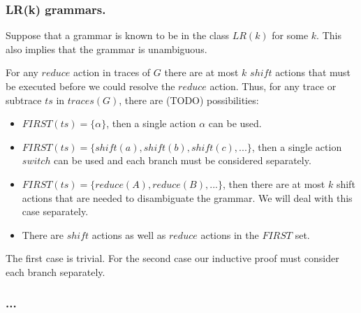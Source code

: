 \documentclass[envcountsame,runningheads]{llncs}
\begin{document}
\subsubsection{LR(k) grammars.}

Suppose that a grammar is known to be in the class $LR(k)$ for some $k$. This also implies that the grammar is unambiguous.

For any $reduce$ action in traces of $G$ there are at most $k$ $shi\!ft$ actions that must be executed before we could resolve the $reduce$ action.
Thus, for any trace or subtrace $ts$ in $traces(G)$, there are (TODO) possibilities:

\begin{itemize}
  \item $F\!I\!RST(ts) = \{ \alpha \}$, then a single action $\alpha$ can be used.
  \item $F\!I\!RST(ts) = \{ shift(a), shift(b), shift(c), ... \}$, then a single action $switch$ can be used and each branch must be considered separately.
  \item $F\!I\!RST(ts) = \{ reduce(A), reduce(B), ... \}$, then there are at most $k$ shift actions that are needed to disambiguate the grammar.
        We will deal with this case separately.
  \item There are $shift$ actions as well as $reduce$ actions in the $F\!I\!RST$ set.
\end{itemize}

The first case is trivial.
For the second case our inductive proof must consider each branch separately.

\subsubsection{...}
\end{document}
